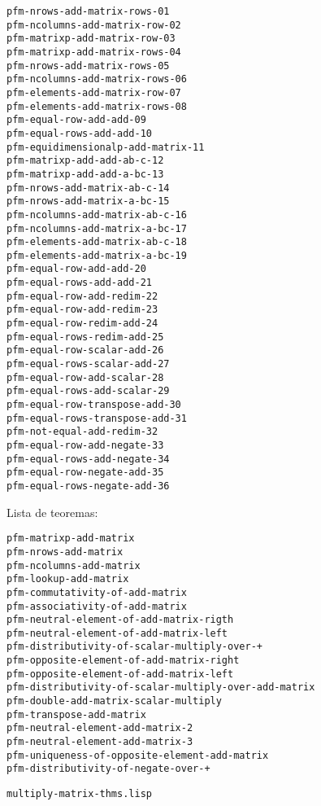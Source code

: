 \documentclass[a4paper,10pt]{article}
\begin{document}
\begin{lstlisting}[language=clips]
pfm-nrows-add-matrix-rows-01
pfm-ncolumns-add-matrix-row-02
pfm-matrixp-add-matrix-row-03
pfm-matrixp-add-matrix-rows-04
pfm-nrows-add-matrix-rows-05
pfm-ncolumns-add-matrix-rows-06
pfm-elements-add-matrix-row-07
pfm-elements-add-matrix-rows-08
pfm-equal-row-add-add-09
pfm-equal-rows-add-add-10
pfm-equidimensionalp-add-matrix-11
pfm-matrixp-add-add-ab-c-12
pfm-matrixp-add-add-a-bc-13
pfm-nrows-add-matrix-ab-c-14
pfm-nrows-add-matrix-a-bc-15
pfm-ncolumns-add-matrix-ab-c-16
pfm-ncolumns-add-matrix-a-bc-17
pfm-elements-add-matrix-ab-c-18
pfm-elements-add-matrix-a-bc-19
pfm-equal-row-add-add-20
pfm-equal-rows-add-add-21
pfm-equal-row-add-redim-22
pfm-equal-row-add-redim-23
pfm-equal-row-redim-add-24
pfm-equal-rows-redim-add-25
pfm-equal-row-scalar-add-26
pfm-equal-rows-scalar-add-27
pfm-equal-row-add-scalar-28
pfm-equal-rows-add-scalar-29
pfm-equal-row-transpose-add-30
pfm-equal-rows-transpose-add-31
pfm-not-equal-add-redim-32
pfm-equal-row-add-negate-33
pfm-equal-rows-add-negate-34
pfm-equal-row-negate-add-35
pfm-equal-rows-negate-add-36
\end{lstlisting}

\par \vspace{10pt}

Lista de teoremas:

\par \vspace{10pt}

\begin{lstlisting}[language=clips]
pfm-matrixp-add-matrix
pfm-nrows-add-matrix
pfm-ncolumns-add-matrix
pfm-lookup-add-matrix
pfm-commutativity-of-add-matrix
pfm-associativity-of-add-matrix
pfm-neutral-element-of-add-matrix-rigth                          
pfm-neutral-element-of-add-matrix-left
pfm-distributivity-of-scalar-multiply-over-+
pfm-opposite-element-of-add-matrix-right
pfm-opposite-element-of-add-matrix-left
pfm-distributivity-of-scalar-multiply-over-add-matrix
pfm-double-add-matrix-scalar-multiply
pfm-transpose-add-matrix
pfm-neutral-element-add-matrix-2
pfm-neutral-element-add-matrix-3
pfm-uniqueness-of-opposite-element-add-matrix  
pfm-distributivity-of-negate-over-+
\end{lstlisting}

\par \vspace{24pt}
\texttt{multiply-matrix-thms.lisp}

\par \vspace{10pt}
\end{document}
